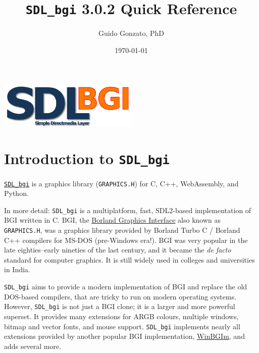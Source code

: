 \documentclass[a4paper,12pt]{article}
\newcommand{\version}{3.0.2}        %
\newcommand{\ntt}[1]{\texttt{#1}}
\newcommand{\T}[1]{\ntt{#1}}         %
\newcommand{\SDLbgi}{\texttt{SDL\_bgi}}
\begin{document}
\setlength{\headheight}{14.5pt}

\title{\SDLbgi{} \version{} Quick Reference}

\author{Guido Gonzato, PhD}

\date{\today}

\maketitle

\begin{center}
  \includegraphics[width=0.5\textwidth]{SDL_bgi_logo.png}
\end{center}

\medskip

\begin{multicols}{2}
{\small \tableofcontents}
\end{multicols}


\section{Introduction to \SDLbgi}

\href{https://sdl-bgi.sourceforge.io}{\SDLbgi} is a graphics library
(\ntt{GRAPHICS.H}) for C, C++, WebAssembly, and Py\-thon.

In more detail: \SDLbgi{} is a multiplatform, fast, SDL2-based
implementation of BGI written in C. BGI, the
\href{https://en.wikipedia.org/wiki/Borland_Graphics_Interface}
{Borland Graphics Interface} also known as \T{GRAPHICS.H}, was a
graphics library provided by Borland Turbo C / Borland C++ compilers
for MS-DOS (pre-Windows era!). BGI was very popular in the late
eighties--early nineties of the last century, and it became the
\emph{de facto} standard for computer graphics. It is still widely
used in colleges and universities in India.

\SDLbgi{} aims to provide a modern implementation of BGI and replace
the old DOS-based compilers, that are tricky to run on modern
operating systems. However, \SDLbgi{} is not just a BGI clone; it is a
larger and more powerful superset. It provides many extensions for
ARGB colours, multiple windows, bitmap and vector fonts, and mouse
support. \SDLbgi{} implements nearly all extensions provided by
another popular BGI implementation,
\href{https://winbgim.codecutter.org/}{WinBGIm}, and adds several
more.
\end{document}
